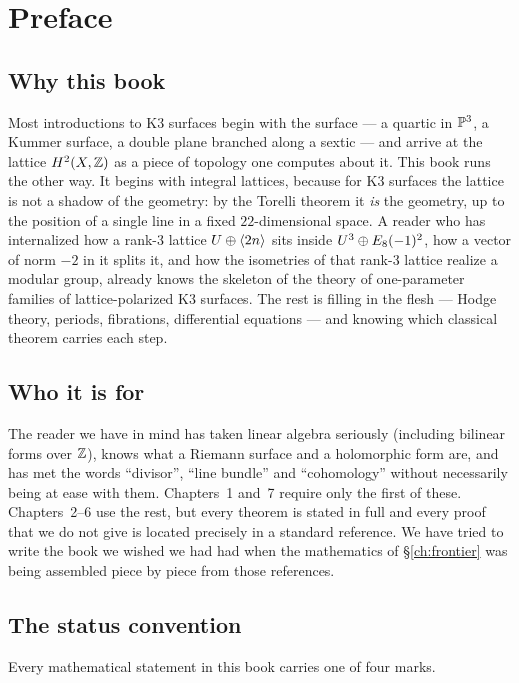\chapter*{Preface}

\section*{Why this book}

Most introductions to K3 surfaces begin with the surface --- a quartic in
$\mathbb{P}^3$, a Kummer surface, a double plane branched along a sextic --- and
arrive at the lattice $H^2(X,\mathbb{Z})$ as a piece of topology one computes about
it. This book runs the other way. It begins with integral lattices, because
for K3 surfaces the lattice is not a shadow of the geometry: by the Torelli
theorem it \emph{is} the geometry, up to the position of a single line in a
fixed $22$-dimensional space. A reader who has internalized how a rank-3
lattice $U\oplus\langle 2n\rangle$ sits inside $U^3\oplus E_8(-1)^2$, how a vector of
norm $-2$ in it splits it, and how the isometries of that rank-3 lattice
realize a modular group, already knows the skeleton of the theory of
one-parameter families of lattice-polarized K3 surfaces. The rest is filling
in the flesh --- Hodge theory, periods, fibrations, differential equations ---
and knowing which classical theorem carries each step.

\section*{Who it is for}

The reader we have in mind has taken linear algebra seriously (including
bilinear forms over $\mathbb{Z}$), knows what a Riemann surface and a holomorphic
form are, and has met the words ``divisor'', ``line bundle'' and
``cohomology'' without necessarily being at ease with them. Chapters~1 and~7
require only the first of these. Chapters~2--6 use the rest, but every
theorem is stated in full and every proof that we do not give is located
precisely in a standard reference. We have tried to write the book we wished
we had had when the mathematics of \S\ref{ch:frontier} was being assembled
piece by piece from those references.

\section*{The status convention}

Every mathematical statement in this book carries one of four marks.

